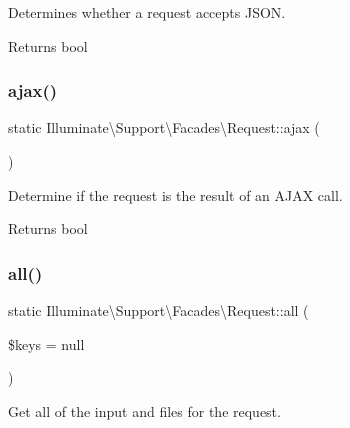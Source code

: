 Determines whether a request accepts J\+S\+ON.

\begin{DoxyReturn}{Returns}
bool 
\end{DoxyReturn}
\mbox{\label{class_illuminate_1_1_support_1_1_facades_1_1_request_aecead1bc0512dadbebbf5e7aa74b2544}} 
\subsubsection{\texorpdfstring{ajax()}{ajax()}}
{\footnotesize\ttfamily static Illuminate\textbackslash{}\+Support\textbackslash{}\+Facades\textbackslash{}\+Request\+::ajax (\begin{DoxyParamCaption}{ }\end{DoxyParamCaption})\hspace{0.3cm}{\ttfamily [static]}}

Determine if the request is the result of an A\+J\+AX call.

\begin{DoxyReturn}{Returns}
bool 
\end{DoxyReturn}
\mbox{\label{class_illuminate_1_1_support_1_1_facades_1_1_request_a0dd690dbf4cbc66977fd67bd026189f0}} 
\subsubsection{\texorpdfstring{all()}{all()}}
{\footnotesize\ttfamily static Illuminate\textbackslash{}\+Support\textbackslash{}\+Facades\textbackslash{}\+Request\+::all (\begin{DoxyParamCaption}\item[{}]{\$keys = {\ttfamily null} }\end{DoxyParamCaption})\hspace{0.3cm}{\ttfamily [static]}}

Get all of the input and files for the request.


